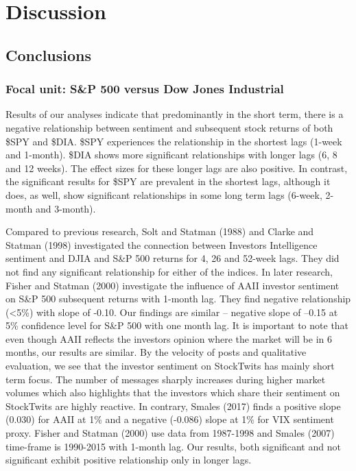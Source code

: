 \section{Discussion} \label{discussion-section}
\subsection{Conclusions}

\subsubsection{Focal unit: S\&P 500 versus Dow Jones Industrial}
Results of our analyses indicate that predominantly in the short term, there is a negative relationship between sentiment and subsequent stock returns of both \$SPY and \$DIA. \$SPY experiences the relationship in the shortest lags (1-week and 1-month). \$DIA shows more significant relationships with longer lags (6, 8 and 12 weeks). The effect sizes for these longer lags are also positive. In contrast, the significant results for \$SPY are prevalent in the shortest lags, although it does, as well, show significant relationships in some long term lags (6-week, 2-month and 3-month).
\par
Compared to previous research, Solt and Statman (1988) and Clarke and Statman (1998) investigated the connection between Investors Intelligence sentiment and DJIA and S\&P 500 returns for 4, 26 and 52-week lags. They did not find any significant relationship for either of the indices. In later research, Fisher and Statman (2000) investigate the influence of AAII investor sentiment on S\&P 500 subsequent returns with 1-month lag. They find negative relationship (<5\%) with slope of -0.10. Our findings are similar – negative slope of –0.15 at 5\% confidence level for S\&P 500 with one month lag. It is important to note that even though AAII reflects the investors opinion where the market will be in 6 months, our results are similar. By the velocity of posts and qualitative evaluation, we see that the investor sentiment on StockTwits has mainly short term focus. The number of messages sharply increases during higher market volumes which also highlights that the investors which share their sentiment on StockTwits are highly reactive. In contrary, Smales (2017) finds a positive slope (0.030) for AAII at 1\% and a negative (-0.086) slope at 1\% for VIX sentiment proxy. Fisher and Statman (2000) use data from 1987-1998 and Smales (2007) time-frame is 1990-2015 with 1-month lag. Our results, both significant and not significant exhibit positive relationship only in longer lags.

